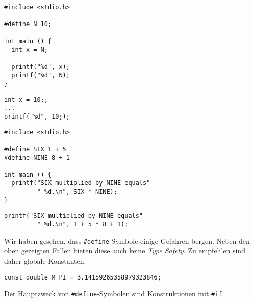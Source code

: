 
\begin{frame}[fragile]{}
%
%
\begin{minipage}{.495\linewidth}
\begin{warnbox}[Kein Semikolon, leftupper=6mm, equal height group=grDangers1]
\begin{verbatim}
#include <stdio.h>

#define N 10;

int main () {
  int x = N;
  
  printf("%d", x);
  printf("%d", N);
}

\end{verbatim}
\end{warnbox}
%
\begin{codebox}[Expansion, leftupper=6mm, equal height group=grDangers2]
\begin{verbatim}
int x = 10;;
...  
printf("%d", 10;);
\end{verbatim}
\end{codebox}
\end{minipage}
%
%
\begin{minipage}{.495\linewidth}
\begin{warnbox}[Klammern, leftupper=6mm, equal height group=grDangers1]
\begin{verbatim}
#include <stdio.h>

#define SIX 1 + 5
#define NINE 8 + 1

int main () {
  printf("SIX multiplied by NINE equals"
         " %d.\n", SIX * NINE);
}
\end{verbatim}
\end{warnbox}
%
\begin{codebox}[Expansion, leftupper=6mm, equal height group=grDangers2]
\begin{verbatim}
printf("SIX multiplied by NINE equals"
         " %d.\n", 1 + 5 * 8 + 1);
\end{verbatim}
\end{codebox}
\end{minipage}
%
\end{frame}


\begin{frame}[fragile]
%
\begin{hintbox}
Wir haben gesehen, dass \texttt{#define}-Symbole einige Gefahren bergen. Neben den oben gezeigten Fallen bieten diese auch keine \emph{Type Safety}. Zu empfehlen sind daher globale Konstanten:
\begin{center}
\texttt{const double M_PI = 3.14159265358979323846;}
\end{center}

Der Hauptzweck von \texttt{#define}-Symbolen sind Konstruktionen mit \texttt{#if}.
\end{hintbox}
%
\end{frame}

